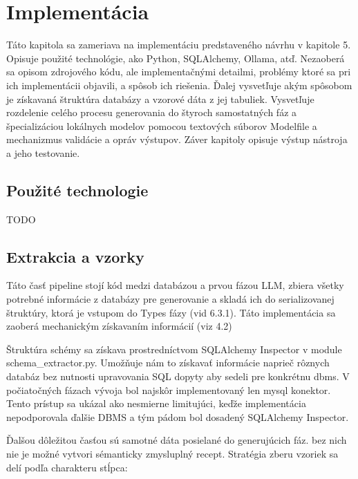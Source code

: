 \chapter{Implementácia}
\label{ch:kap6}
Táto kapitola sa zameriava na implementáciu predstaveného návrhu v kapitole 5. Opisuje použité technológie, ako Python, SQLAlchemy, Ollama, atď. Nezaoberá sa  opisom zdrojového kódu, ale implementačnými detailmi, problémy ktoré sa pri ich implementácii objavili, a spôsob ich riešenia. Ďalej vysvetľuje akým spôsobom je získavaná štruktúra databázy a vzorové dáta z jej tabuliek. Vysvetľuje rozdelenie celého procesu generovania do štyroch samostatných fáz a špecializáciou lokálnych modelov pomocou textových súborov Modelfile a mechanizmus validácie a opráv výstupov. Záver kapitoly opisuje výstup nástroja a jeho testovanie.

\section{Použité technologie}
TODO

\section{Extrakcia a vzorky}
Táto časť pipeline stojí kód medzi databázou a prvou fázou LLM, zbiera všetky potrebné informácie z databázy pre generovanie a skladá ich do serializovanej štruktúry, ktorá je vstupom do Types fázy (vid 6.3.1). Táto implementácia  sa zaoberá mechanickým získavaním informácií (viz 4.2)

Štruktúra schémy sa získava prostredníctvom SQLAlchemy Inspector v module schema\_extractor.py. Umožňuje nám to získavať informácie naprieč rôznych databáz bez nutnosti upravovania SQL dopyty aby sedeli pre konkrétnu dbms. V počiatočných fázach vývoja bol najskôr implementovaný len mysql konektor. Tento prístup sa ukázal ako nesmierne limitujúci, keďže implementácia nepodporovala ďalšie DBMS a tým pádom bol dosadený SQLAlchemy Inspector.

Ďalšou dôležitou časťou sú samotné dáta posielané do generujúcich fáz. bez nich nie je možné vytvori sémanticky zmysluplný recept. Stratégia zberu vzoriek sa delí podľa charakteru stĺpca:

